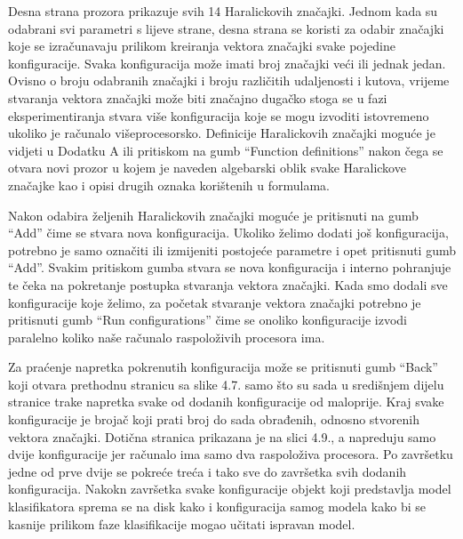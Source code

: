\documentclass[times, utf8, zavrsni]{fer}
\begin{document}
\bigbreak

Desna strana prozora prikazuje svih 14 Haralickovih značajki. Jednom kada 
su odabrani svi parametri s lijeve strane, desna strana se koristi za odabir 
značajki koje se izračunavaju prilikom kreiranja vektora značajki svake pojedine
konfiguracije. Svaka konfiguracija može imati broj značajki veći ili jednak jedan. 
Ovisno o broju odabranih značajki i broju različitih udaljenosti i kutova, vrijeme
stvaranja vektora značajki može biti značajno dugačko stoga se u fazi eksperimentiranja
stvara više konfiguracija koje se mogu izvoditi istovremeno ukoliko je računalo
višeprocesorsko. Definicije Haralickovih značajki moguće je vidjeti u Dodatku A
ili pritiskom na gumb \enquote{Function definitions} nakon čega se otvara novi
prozor u kojem je naveden algebarski oblik svake Haralickove značajke kao i 
opisi drugih oznaka korištenih u formulama. 

\bigbreak

Nakon odabira željenih Haralickovih
značajki moguće je pritisnuti na gumb \enquote{Add} čime se stvara
nova konfiguracija. Ukoliko želimo dodati još konfiguracija, potrebno je samo
označiti ili izmijeniti postojeće parametre i opet pritisnuti gumb \enquote{Add}.
Svakim pritiskom gumba stvara se nova konfiguracija i interno pohranjuje te čeka na
pokretanje postupka stvaranja vektora značajki. Kada smo dodali sve konfiguracije
koje želimo, za početak stvaranje vektora značajki potrebno je pritisnuti gumb
\enquote{Run configurations} čime se onoliko konfiguracije izvodi paralelno koliko
naše računalo raspoloživih procesora ima. 

\bigbreak

Za praćenje napretka pokrenutih konfiguracija može se pritisnuti gumb 
\enquote{Back} koji otvara prethodnu stranicu sa slike 4.7. samo što su sada
u središnjem dijelu stranice trake napretka svake od dodanih konfiguracije od maloprije. 
Kraj svake konfiguracije je brojač koji prati broj do sada obrađenih, odnosno
stvorenih vektora značajki. Dotična stranica prikazana je na slici 4.9., a 
napreduju samo dvije konfiguracije jer računalo ima samo dva raspoloživa procesora.
Po završetku jedne od prve dvije se pokreće treća i tako sve do završetka svih 
dodanih konfiguracija. Nakokn završetka svake konfiguracije objekt koji predstavlja 
model klasifikatora sprema se na disk kako i konfiguracija samog modela kako
bi se kasnije prilikom faze klasifikacije mogao učitati ispravan model.
\end{document}
